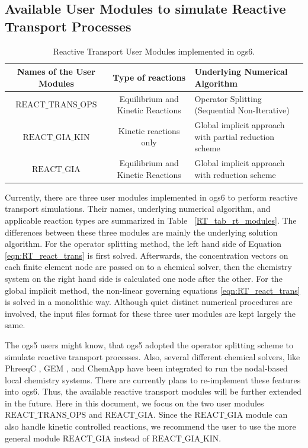 \subsection{Available User Modules to simulate Reactive Transport Processes}

\begin{table}
\label{tab:RT_tab_rt_modules}
\caption{Reactive Transport User Modules implemented in ogs6. }
\begin{tabular}{c c p{5.5cm}}
\hline
Names of the User Modules    & Type of reactions & Underlying Numerical Algorithm \\
\hline
$\mathrm{REACT\_TRANS\_OPS}$      & Equilibrium and Kinetic Reactions    & Operator Splitting (Sequential Non-Iterative)      \\
$\mathrm{REACT\_GIA\_KIN}$        & Kinetic reactions only     & Global implicit approach with partial reduction scheme      \\
$\mathrm{REACT\_GIA}$            & Equilibrium and Kinetic Reactions     & Global implicit approach with reduction scheme      \\
\hline
\end{tabular}
\end{table}

Currently, there are three user modules implemented in ogs6 to perform reactive transport simulations. Their names, underlying numerical algorithm, and applicable reaction types are summarized in Table ~\ref{RT_tab_rt_modules}. The differences between these three modules are mainly the underlying solution algorithm. For the operator splitting method, the left hand side of Equation \ref{eqn:RT_react_trans} is first solved. Afterwards, the concentration vectors on each finite element node are passed on to a chemical solver, then the chemistry system on the right hand side is calculated one node after the other. For the global implicit method, the non-linear governing equations \ref{eqn:RT_react_trans} is solved in a monolithic way. Although quiet distinct numerical procedures are involved, the input files format for these three user modules are kept largely the same. 

The ogs5 users might know, that ogs5 adopted the operator splitting scheme to simulate reactive transport processes. Also, several different chemical solvers, like PhreeqC \cite{Xie2006}, GEM \cite{Shao2009}, and ChemApp \cite{Graupner2011} have been integrated to run the nodal-based local chemistry systems. There are currently plans to re-implement these features into ogs6. Thus, the available reactive transport modules will be further extended in the future. Here in this document, we focus on the two user modules $\mathrm{REACT\_TRANS\_OPS}$  and $\mathrm{REACT\_GIA}$. Since the $\mathrm{REACT\_GIA}$ module can also handle kinetic controlled reactions, we recommend the user to use the more general module $\mathrm{REACT\_GIA}$ instead of $\mathrm{REACT\_GIA\_KIN}$. 


